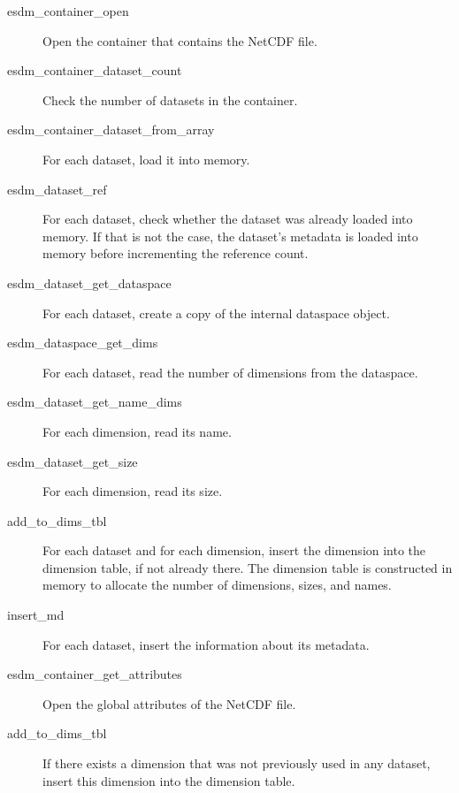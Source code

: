 \begin{description}

\item[esdm\_container\_open]

Open the container that contains the NetCDF file.

\item[esdm\_container\_dataset\_count]

Check the number of datasets in the container.

\item[esdm\_container\_dataset\_from\_array]

For each dataset, load it into memory.

\item[esdm\_dataset\_ref]

For each dataset, check whether the dataset was already loaded into memory.
If that is not the case, the dataset’s metadata is loaded into memory before incrementing the reference count.

\item[esdm\_dataset\_get\_dataspace]

For each dataset, create a copy of the internal dataspace object.

\item[esdm\_dataspace\_get\_dims]

For each dataset, read the number of dimensions from the dataspace.

\item[esdm\_dataset\_get\_name\_dims]

For each dimension, read its name.

\item[esdm\_dataset\_get\_size]

For each dimension, read its size.

\item[add\_to\_dims\_tbl]

For each dataset and for each dimension, insert the dimension into the dimension table, if not already there. The dimension table is constructed in memory to allocate the number of dimensions, sizes, and names.

\item[insert\_md]

For each dataset, insert the information about its metadata.

\item[esdm\_container\_get\_attributes]

Open the global attributes of the NetCDF file.

\item[add\_to\_dims\_tbl]

If there exists a dimension that was not previously used in any dataset, insert this dimension into the dimension table.

\end{description}


